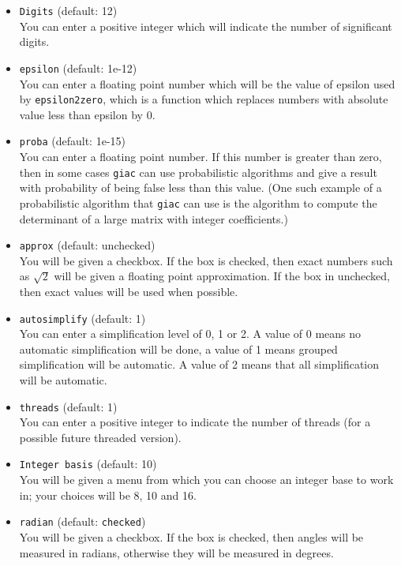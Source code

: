\documentclass[a4paper,11pt]{book}
\begin{document}
\begin{itemize}
  \item \texttt{Digits}  (default: 12)\\
  You can enter a positive integer which will indicate the number of
  significant digits.
  
  \item \texttt{epsilon}  (default: 1e-12)\\
  You can enter a floating point number which will be the value of
  epsilon used by \texttt{epsilon2zero}, which is a function which
  replaces numbers with absolute value less than epsilon by 0.
  
  \item \texttt{proba}  (default: 1e-15)\\
  You can enter a floating point number.  If this number is greater
  than zero, then in some cases \texttt{giac} can use
  probabilistic algorithms and give a result with probability of being
  false less than this value.  (One such example of a probabilistic
  algorithm that \texttt{giac} can use is the algorithm to compute the
  determinant of a large matrix with integer coefficients.)
  
  \item \texttt{approx}  (default: unchecked)\\
  You will be given a checkbox.  If the box is checked, then exact
  numbers such as $\sqrt{2}$ will be given a floating point approximation.  If
  the box in unchecked, then exact values will be used when possible.
  
  \item \texttt{autosimplify}  (default: 1)\\
  You can enter a simplification level of 0, 1 or 2.  A value of 0
  means no automatic simplification will be done, a value of 1 means
  grouped simplification will be automatic.  A value of 2 means that
  all simplification will be automatic.
  
  \item \texttt{threads}  (default: 1)\\
  You can enter a positive integer to indicate the number of threads
  (for a possible future threaded version).
  
  \item \texttt{Integer basis}  (default: 10)\\
  You will be given a menu from which you can choose an integer base
  to work in; your choices will be 8, 10 and 16.
  
  \item \texttt{radian} (default: \texttt{checked})\\
  You will be given a checkbox.  If the box is checked, then angles
  will be measured in radians, otherwise they will be measured in
  degrees.
  

\end{itemize}
\end{document}
